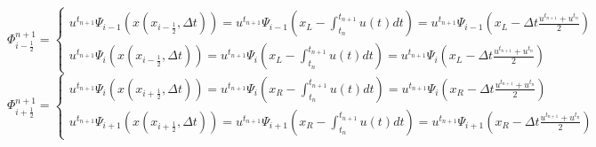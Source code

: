 \documentclass[10pt,a4paper]{article}
\begin{document}
\begin{equation}
\label{eqn:FlowLNextXSubst}
\Phi_{i-\frac{1}{2}}^{n+1}=\begin{cases}
u^{t_{n+1}} \Psi_{i-1}(x(x_{i-\frac{1}{2}}, \Delta t))=
u^{t_{n+1}} \Psi_{i-1}(x_L-\int_{t_n}^{t_{n+1}}u(t)dt)=u^{t_{n+1}}\Psi_{i-1}(x_L-\Delta t \frac{u^{t_{n+1}}+u^{t_{n}}}{2})

\\
u^{t_{n+1}} \Psi_{i}(x(x_{i-\frac{1}{2}}, \Delta t))=
u^{t_{n+1}} \Psi_{i}(x_L-\int_{t_n}^{t_{n+1}}u(t)dt)=u^{t_{n+1}}\Psi_{i}(x_L-\Delta t \frac{u^{t_{n+1}}+u^{t_{n}}}{2})

\end{cases}
\end{equation}
\begin{equation}
\label{eqn:FlowRNextXSubst}
\Phi_{i+\frac{1}{2}}^{n+1}=\begin{cases}
u^{t_{n+1}} \Psi_{i}(x(x_{i+\frac{1}{2}}, \Delta t))=
u^{t_{n+1}} \Psi_{i}(x_R-\int_{t_n}^{t_{n+1}}u(t)dt)=u^{t_{n+1}}\Psi_{i}(x_R-\Delta t \frac{u^{t_{n+1}}+u^{t_{n}}}{2})

\\
u^{t_{n+1}} \Psi_{i+1}(x(x_{i+\frac{1}{2}}, \Delta t))=
u^{t_{n+1}} \Psi_{i+1}(x_R-\int_{t_n}^{t_{n+1}}u(t)dt)=u^{t_{n+1}}\Psi_{i+1}(x_R-\Delta t \frac{u^{t_{n+1}}+u^{t_{n}}}{2})

\end{cases}
\end{equation}
\end{document}
